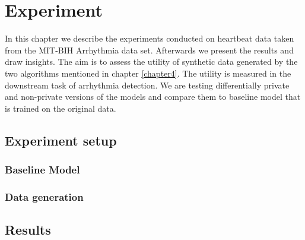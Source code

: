 \section{Experiment}
In this chapter we describe the experiments conducted on heartbeat data taken from the MIT-BIH Arrhythmia data set. Afterwards we present the results and draw insights. The aim is to assess the utility of synthetic data generated by the two algorithms mentioned in chapter \ref{chapter4}. The utility is measured in the downstream task of arrhythmia detection. We are testing differentially private and non-private versions of the models and compare them to baseline model that is trained on the original data.

\subsection{Experiment setup}
\subsubsection*{Baseline Model}

\subsubsection*{Data generation}


\subsection{Results}